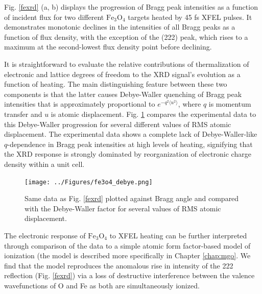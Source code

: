 \documentclass [11pt, proquest, article] {uwthesis}[2016/11/22]
\begin{document}
Fig. \ref{fexrd} (a, b) displays the progression of Bragg peak intensities as a function of incident flux for two different $\mathrm{Fe}_3\mathrm{O}_4$ targets heated by 45 fs XFEL pulses. It demonstrates monotonic declines in the intensities of all Bragg peaks as a function of flux density, with the exception of the (222) peak, which rises to a maximum at the second-lowest flux density point before declining.

\FloatBarrier

It is straightforward to evaluate the relative contributions of thermalization of electronic and lattice degrees of freedom to the XRD signal's evolution as a function of heating. The main distinguishing feature between these two components is that the latter causes Debye-Waller quenching of Bragg peak intensities that is approximately proportional to $e^{-q^2\langle u^2 \rangle}$, where $q$ is momentum transfer and $u$ is atomic displacement. Fig. \ref{debye} compares the experimental data to this Debye-Waller progression for several different values of RMS atomic displacement. The experimental data shows a complete lack of Debye-Waller-like $q$-dependence in Bragg peak intensities at high levels of heating, signifying that the XRD response is strongly dominated by reorganization of electronic charge density within a unit cell. 

\begin{figure}[h] 
\caption{Same data as Fig. \ref{fexrd} plotted against Bragg angle and compared with the Debye-Waller factor for several values of RMS atomic displacement. \cite{mortfe3o4}}
\label{debye}
\centering
\texttt{[image: ../Figures/fe3o4\_debye.png]}
\end{figure}

The electronic response of $\mathrm{Fe}_3\mathrm{O}_4$ to XFEL heating can be further interpreted through comparison of the data to a simple atomic form factor-based model of ionization (the model is described more specifically in Chapter \ref{chap:mgo}. We find that the model reproduces the anomalous rise in intensity of the 222 reflection (Fig. \ref{fexrd}) via a loss of destructive interference between the valence wavefunctions of O and Fe as both are simultaneously ionized. \cite{mortfe3o4}

%
\end{document}
